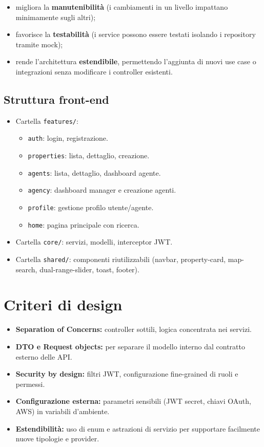 \documentclass[a4paper,11pt]{report}
\begin{document}
\begin{itemize}[nosep]
  \item migliora la \textbf{manutenibilità} (i cambiamenti in un livello impattano minimamente sugli altri);
  \item favorisce la \textbf{testabilità} (i service possono essere testati isolando i repository tramite mock);
  \item rende l'architettura \textbf{estendibile}, permettendo l'aggiunta di nuovi use case o integrazioni senza modificare i controller esistenti.
\end{itemize}

\subsection{Struttura front-end}

\begin{itemize}[nosep]
  \item Cartella \texttt{features/}:
    \begin{itemize}[nosep]
      \item \texttt{auth}: login, registrazione.
      \item \texttt{properties}: lista, dettaglio, creazione.
      \item \texttt{agents}: lista, dettaglio, dashboard agente.
      \item \texttt{agency}: dashboard manager e creazione agenti.
      \item \texttt{profile}: gestione profilo utente/agente.
      \item \texttt{home}: pagina principale con ricerca.
    \end{itemize}
  \item Cartella \texttt{core/}: servizi, modelli, interceptor JWT.
  \item Cartella \texttt{shared/}: componenti riutilizzabili (navbar, property-card, map-search, dual-range-slider, toast, footer).
\end{itemize}

\section{Criteri di design}

\begin{itemize}[nosep]
  \item \textbf{Separation of Concerns:} controller sottili, logica concentrata nei servizi.
  \item \textbf{DTO e Request objects:} per separare il modello interno dal contratto esterno delle API.
  \item \textbf{Security by design:} filtri JWT, configurazione fine-grained di ruoli e permessi.
  \item \textbf{Configurazione esterna:} parametri sensibili (JWT secret, chiavi OAuth, AWS) in variabili d’ambiente.
  \item \textbf{Estendibilità:} uso di enum e astrazioni di servizio per supportare facilmente nuove tipologie e provider.
\end{itemize}
\end{document}
